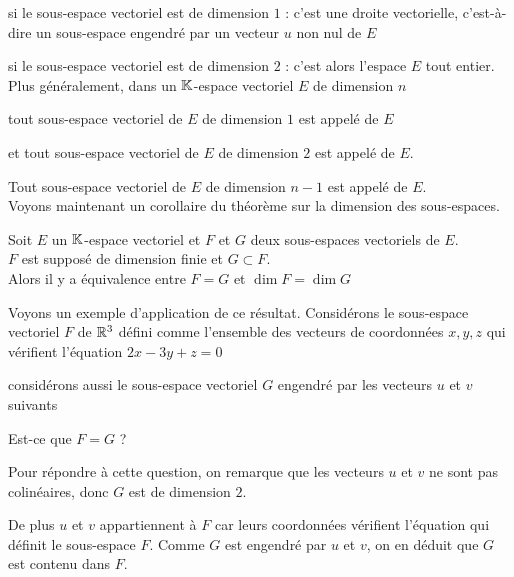 \change
  
si le sous-espace vectoriel est  de dimension $1$ : c'est une droite vectorielle, c'est-à-dire 
 un sous-espace engendré par un vecteur $u$ non nul de $E$ 
  
  \change
 si le sous-espace vectoriel est  de dimension $2$ : c'est alors l'espace $E$ tout entier.\\
 
 \change
 Plus généralement, dans un $\mathbb{K}$-espace vectoriel $E$ de dimension $n$ 

\change
tout sous-espace vectoriel de $E$ de dimension $1$ est 
appelé  de $E$ 

\change
et tout sous-espace vectoriel de 
$E$ de dimension $2$ est appelé  de $E$.

\change
Tout sous-espace vectoriel de $E$ de dimension $n-1$ est 
appelé  de $E$. \\


\diapo
Voyons maintenant un corollaire du théorème sur la dimension des sous-espaces.

Soit $E$ un $\mathbb{K}$-espace vectoriel
et
$F$ et $G$ deux sous-espaces vectoriels de $E$.\\

$F$ est supposé de dimension finie
et $G \subset F$.
\\
Alors il y a équivalence entre
$F=G$ et $ \dim F = \dim G$

\change
Voyons un exemple d'application de ce résultat.
Considérons le sous-espace vectoriel $F$ de $\mathbb{R}^3$ défini comme l'ensemble des vecteurs de coordonnées $x,y,z$ 
qui vérifient l'équation $2x-3y+z=0$

\change
considérons aussi le sous-espace vectoriel $G$ engendré par les vecteurs $u$ et $v$ suivants

\change
Est-ce que $F=G$ ?

\change
Pour répondre à cette question, on remarque que les vecteurs $u$ et $v$ ne sont pas colinéaires, 
donc $G$ est de dimension $2$.

\change
 De plus $u$ et $v$ appartiennent à $F$ car leurs coordonnées vérifient l'équation qui définit le sous-espace $F$.
 Comme $G$ est engendré par $u$ et $v$, on en déduit que $G$ est contenu dans $F$.
  
